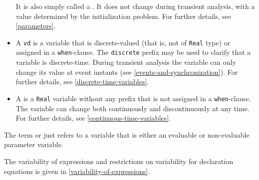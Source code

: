 \begin{itemize}
  It is also simply called a .
  It does not change during transient analysis, with a value determined by the initialization problem.
  For further details, see \ref{parameters}.
\item
  A  \lstinline!vd! is a variable that is discrete-valued (that is, not of \lstinline!Real! type) or assigned in a \lstinline!when!-clause.
  The \lstinline!discrete! prefix may be used to clarify that a variable is discrete-time.
  During transient analysis the variable can only change its value at event instants (see \cref{events-and-synchronization}).
  For further details, see \ref{discrete-time-variables}.
\item
  A  is a \lstinline!Real! variable without any prefix that is not assigned in a \lstinline!when!-clause.
  The variable can change both continuously and discontinuously at any time.
  For further details, see \ref{continuous-time-variables}.
\end{itemize}

The term  or just  refers to a variable that is either an evaluable or non-evaluable parameter variable.

The variability of expressions and restrictions on variability for declaration equations is given in \cref{variability-of-expressions}.

